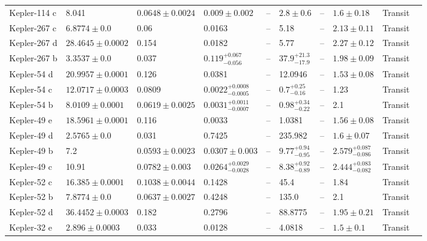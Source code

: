 \begin{tabular}{llllllllll}
Kepler-114 c & 8.041 & $0.0648 \pm 0.0024$ & $0.009 \pm 0.002$ & -- & $2.8 \pm 0.6$ & -- & $1.6 \pm 0.18$ & Transit & \cite{XIE_2014} \\
Kepler-267 c & $6.8774 \pm 0.0$ & 0.06 & 0.0163 & -- & 5.18 & -- & $2.13 \pm 0.11$ & Transit & \cite{ROWE_ET_AL__2014} \\
Kepler-267 d & $28.4645 \pm 0.0002$ & 0.154 & 0.0182 & -- & 5.77 & -- & $2.27 \pm 0.12$ & Transit & \cite{ROWE_ET_AL__2014} \\
Kepler-267 b & $3.3537 \pm 0.0$ & 0.037 & $0.119^{+0.067}_{-0.056}$ & -- & $37.9^{+21.3}_{-17.9}$ & -- & $1.98 \pm 0.09$ & Transit & \cite{ROWE_ET_AL__2014} \\
Kepler-54 d & $20.9957 \pm 0.0001$ & 0.126 & 0.0381 & -- & 12.0946 & -- & $1.53 \pm 0.08$ & Transit & \cite{ROWE_ET_AL__2014} \\
Kepler-54 c & $12.0717 \pm 0.0003$ & 0.0809 & $0.0022^{+0.0008}_{-0.0005}$ & -- & $0.7^{+0.25}_{-0.16}$ & -- & 1.23 & Transit & \cite{STEFFEN_ET_AL__2013} \\
Kepler-54 b & $8.0109 \pm 0.0001$ & $0.0619 \pm 0.0025$ & $0.0031^{+0.0011}_{-0.0007}$ & -- & $0.98^{+0.34}_{-0.22}$ & -- & 2.1 & Transit & \cite{STEFFEN_ET_AL__2013} \\
Kepler-49 e & $18.5961 \pm 0.0001$ & 0.116 & 0.0033 & -- & 1.0381 & -- & $1.56 \pm 0.08$ & Transit & \cite{ROWE_ET_AL__2014} \\
Kepler-49 d & $2.5765 \pm 0.0$ & 0.031 & 0.7425 & -- & 235.982 & -- & $1.6 \pm 0.07$ & Transit & \cite{ROWE_ET_AL__2014} \\
Kepler-49 b & 7.2 & $0.0593 \pm 0.0023$ & $0.0307 \pm 0.003$ & -- & $9.77^{+0.94}_{-0.95}$ & -- & $2.579^{+0.087}_{-0.086}$ & Transit & \cite{LELEU_ET_AL__2023} \\
Kepler-49 c & 10.91 & $0.0782 \pm 0.003$ & $0.0264^{+0.0029}_{-0.0028}$ & -- & $8.38^{+0.92}_{-0.89}$ & -- & $2.444^{+0.083}_{-0.082}$ & Transit & \cite{LELEU_ET_AL__2023} \\
Kepler-52 c & $16.385 \pm 0.0001$ & $0.1038 \pm 0.0044$ & 0.1428 & -- & 45.4 & -- & 1.84 & Transit & \cite{STEFFEN_ET_AL__2013} \\
Kepler-52 b & $7.8774 \pm 0.0$ & $0.0637 \pm 0.0027$ & 0.4248 & -- & 135.0 & -- & 2.1 & Transit & \cite{STEFFEN_ET_AL__2013} \\
Kepler-52 d & $36.4452 \pm 0.0003$ & 0.182 & 0.2796 & -- & 88.8775 & -- & $1.95 \pm 0.21$ & Transit & \cite{ROWE_ET_AL__2014} \\
Kepler-32 e & $2.896 \pm 0.0003$ & 0.033 & 0.0128 & -- & 4.0818 & -- & $1.5 \pm 0.1$ & Transit & \cite{FABRYCKY_ET_AL__2012} \\

\end{tabular}
